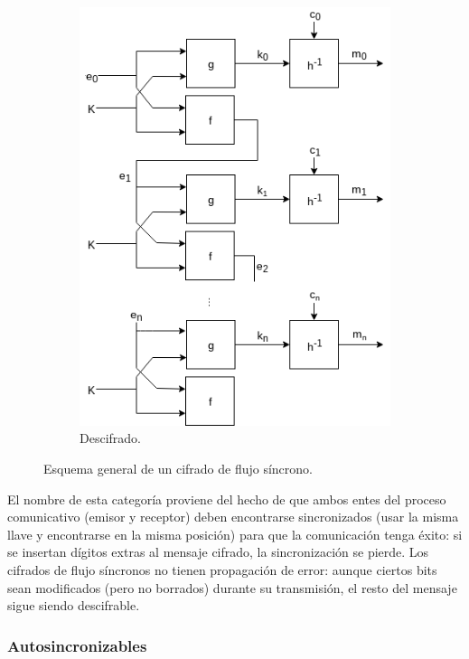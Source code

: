 \begin{figure}[H]
\begin{subfigure}{0.45\textwidth}
\begin{center}
      \includegraphics[width=0.9\linewidth]{diagramas/sincrono_descifrado.png}
      \caption{Descifrado.}
    \end{center}
  \end{subfigure}
  \caption{Esquema general de un cifrado de flujo síncrono.}
  \label{flujo_sincrono}
\end{figure}

El nombre de esta categoría proviene del hecho de que ambos entes del proceso
comunicativo (emisor y receptor) deben encontrarse sincronizados (usar la misma
llave y encontrarse en la misma posición) para que la comunicación tenga éxito:
si se insertan dígitos extras al mensaje cifrado, la sincronización se pierde.
Los cifrados de flujo síncronos no tienen propagación de error: aunque ciertos
bits sean modificados (pero no borrados) durante su transmisión, el resto del
mensaje sigue siendo descifrable.


\subsubsection{Autosincronizables}

